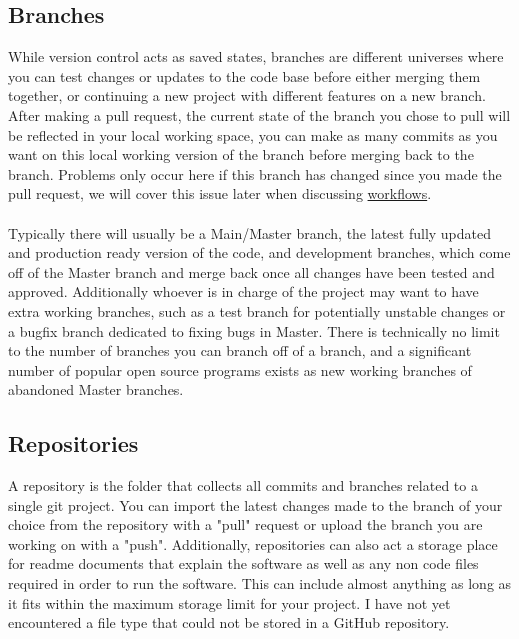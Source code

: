 \documentclass{article}
\begin{document}
\subsection{Branches}
While version control acts as saved states, branches are different universes where you can test changes or updates to the code base before either merging them together, or continuing a new project with different features on a new branch. After making a pull request, the current state of the branch you chose to pull will be reflected in your local working space, you can make as many commits as you want on this local working version of the branch before merging back to the branch. Problems only occur here if this branch has changed since you made the pull request, we will cover this issue later when discussing \hyperref[workflows]{workflows}.

\paragraph{}

Typically there will usually be a Main/Master branch, the latest fully updated and production ready version of the code, and development branches, which come off of the Master branch and merge back once all changes have been tested and approved. Additionally whoever is in charge of the project may want to have extra working branches, such as a test branch for potentially unstable changes or a bugfix branch dedicated to fixing bugs in Master. There is technically no limit to the number of branches you can branch off of a branch, and a significant number of popular open source programs exists as new working branches of abandoned Master branches.
\subsection{Repositories}
A repository is the folder that collects all commits and branches related to a single git project. You can import the latest changes made to the branch of your choice from the repository with a "pull" request or upload the branch you are working on with a "push". Additionally, repositories can also act a storage place for readme documents that explain the software as well as any non code files required in order to run the software. This can include almost anything as long as it fits within the maximum storage limit for your project. I have not yet encountered a file type that could not be stored in a GitHub repository.
\end{document}
